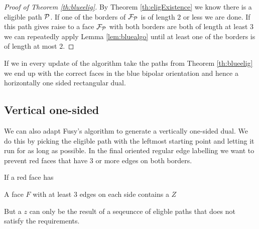 \begin{proof}[Proof of Theorem \ref{th:blueelig}]
By Theorem \ref{th:eligExistence} we know there is a eligible path $\P$. If one of the borders of $\F_\P$ is of length $2$ or less we are done. If this path gives raise to a face $\F_\P$ with both borders are both of length at least $3$ we can repeatedly apply Lemma \ref{lem:bluealgo} until at least one of the borders is of length at most $2$. 
\end{proof}

If we in every update of the algorithm take the paths from Theorem  \ref{th:blueelig} we end up with the correct faces in the blue bipolar orientation and hence a horizontally one sided rectangular dual.

\subsection{Vertical one-sided}
\label{ss:red}

We can also adapt Fusy's algorithm to generate a vertically one-sided dual. We do this by picking the eligible path with the leftmost starting point and letting it run for as long as possible. In the final oriented regular edge labelling we want to prevent red faces that have $3$ or more edges on both borders. 

If a red face has 
\begin{lemma}
A face $F$ with at least $3$ edges on each side contains a $Z$ 
\end{lemma}

But a $z$ can only be the result of a seqeuncce of eligble paths that does not satisfy the requirements. 
